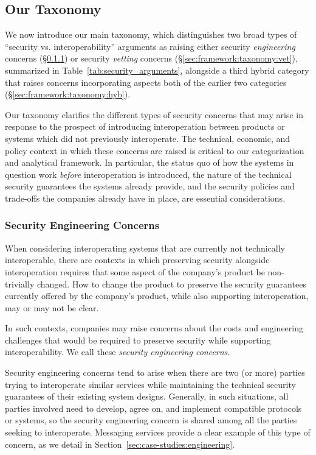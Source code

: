 \documentclass[letterpaper,twocolumn,10pt]{article}
\begin{document}
\medskip

\subsection{Our Taxonomy}
\label{sec:framework:taxonomy}
We now introduce our main taxonomy, which distinguishes two broad types of ``security vs. interoperability'' arguments as raising either security \emph{engineering} concerns (\S \ref{sec:framework:taxonomy:eng}) or security \emph{vetting} concerns (\S \ref{sec:framework:taxonomy:vet}), summarized in Table~\ref{tab:security_arguments}, alongside a third hybrid category that raises concerns incorporating aspects both of the earlier two categories (\S \ref{sec:framework:taxonomy:hyb}).

Our taxonomy clarifies the different types of security concerns that may arise in response to the prospect of introducing interoperation between products or systems which did not previously interoperate. The technical, economic, and policy context in which these concerns are raised is critical to our categorization and analytical framework. In particular, the status quo of how the systems in question work \emph{before} interoperation is introduced, the nature of the technical security guarantees the systems already provide, and the security policies and trade-offs the companies already have in place, are essential considerations.


\subsubsection{Security Engineering Concerns}
\label{sec:framework:taxonomy:eng}

When considering interoperating systems that are currently not technically interoperable, there are contexts in which preserving security alongside interoperation requires that some aspect of the company's product be non-trivially changed. How to change the product to preserve the security guarantees currently offered by the company's product, while also supporting interoperation, may or may not be clear. 

In such contexts, companies may raise concerns about the costs and engineering challenges that would be required to preserve security while supporting interoperability.
We call these \emph{security engineering concerns}.

Security engineering concerns tend to arise when there are two (or more) parties trying to interoperate similar services while maintaining the technical security guarantees of their existing system designs. Generally, in such situations, all parties involved need to develop, agree on, and implement compatible protocols or systems, so the security engineering concern is shared among all the parties seeking to interoperate. Messaging services provide a clear example of this type of concern, as we detail in Section~\ref{sec:case-studies:engineering}.
\end{document}
